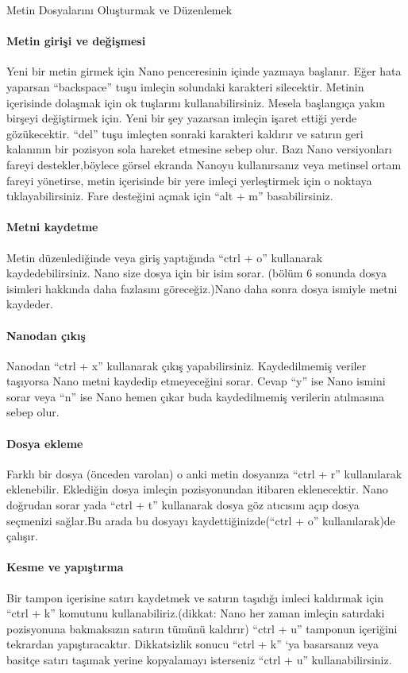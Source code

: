 \begin{section}{Metin Dosyalarını Oluşturmak ve Düzenlemek}
\paragraph{Metin girişi ve değişmesi}{Yeni bir metin girmek için Nano penceresinin içinde yazmaya başlanır. Eğer hata yaparsan “backspace” tuşu imleçin solundaki karakteri silecektir. Metinin içerisinde dolaşmak için ok tuşlarını kullanabilirsiniz. Mesela başlangıça yakın birşeyi değiştirmek için. Yeni bir şey yazarsan imleçin işaret ettiği yerde gözükecektir. “del” tuşu imleçten sonraki karakteri kaldırır ve satırın geri kalanının bir pozisyon sola hareket etmesine sebep olur. Bazı Nano versiyonları fareyi destekler,böylece görsel ekranda Nanoyu kullanırsanız veya metinsel ortam fareyi yönetirse, metin içerisinde bir yere imleçi yerleştirmek için o noktaya tıklayabilirsiniz. Fare desteğini açmak için “alt + m” basabilirsiniz.}

\paragraph{Metni kaydetme}{ Metin düzenlediğinde veya giriş yaptığında “ctrl + o” kullanarak kaydedebilirsiniz. Nano size dosya için bir isim sorar. (bölüm 6 sonunda dosya isimleri hakkında daha fazlasını göreceğiz.)Nano daha sonra dosya ismiyle metni kaydeder.}

\paragraph{Nanodan çıkış}{ Nanodan “ctrl + x” kullanarak çıkış yapabilirsiniz. Kaydedilmemiş veriler taşıyorsa Nano metni kaydedip etmeyeceğini sorar. Cevap “y”  ise Nano ismini sorar veya “n” ise Nano hemen çıkar buda kaydedilmemiş verilerin atılmasına sebep olur.}
\paragraph{Dosya ekleme}{ Farklı bir dosya (önceden varolan) o anki metin dosyanıza “ctrl + r” kullanılarak eklenebilir.  Eklediğin dosya imleçin pozisyonundan itibaren eklenecektir. Nano doğrudan sorar yada “ctrl + t” kullanarak dosya göz atıcısını açıp dosya seçmenizi sağlar.Bu arada bu dosyayı kaydettiğinizde(“ctrl + o” kullanılarak)de çalışır. }
\paragraph{ Kesme ve yapıştırma}{ Bir tampon içerisine satırı kaydetmek ve satırın taşıdığı imleci kaldırmak için “ctrl + k” komutunu kullanabiliriz.(dikkat: Nano her zaman imleçin satırdaki pozisyonuna bakmaksızın satırın tümünü kaldırır) “ctrl + u” tamponun içeriğini tekrardan yapıştıracaktır. Dikkatsizlik sonucu “ctrl + k” ‘ya basarsanız veya basitçe satırı taşımak yerine kopyalamayı isterseniz “ctrl + u” kullanabilirsiniz.}


\end{section}
